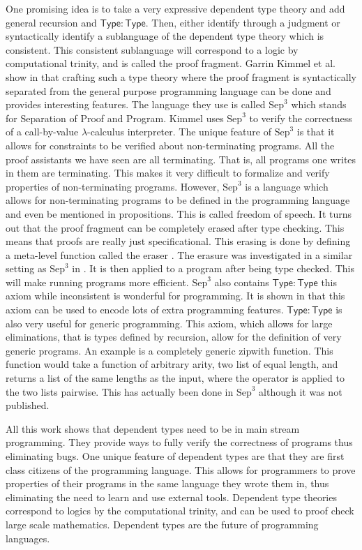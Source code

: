 One promising idea is to take a very expressive dependent type theory
and add general recursion and $\mathsf{Type:Type}$.  Then, either
identify through a judgment or syntactically identify a sublanguage of
the dependent type theory which is consistent.  This consistent
sublanguage will correspond to a logic by computational trinity, and
is called the proof fragment.  Garrin Kimmel et al. show in
\cite{Kimmel:2012} that crafting such a type theory where the proof
fragment is syntactically separated from the general purpose
programming language can be done and provides interesting features.
The language they use is called $\text{Sep}^3$ which stands for
Separation of Proof and Program. Kimmel uses $\text{Sep}^3$ to verify
the correctness of a call-by-value $\lambda$-calculus interpreter.
The unique feature of $\text{Sep}^3$ is that it allows for constraints
to be verified about non-terminating programs.  All the proof
assistants we have seen are all terminating.  That is, all programs
one writes in them are terminating.  This makes it very difficult to
formalize and verify properties of non-terminating programs.  However,
$\text{Sep}^3$ is a language which allows for non-terminating programs
to be defined in the programming language and even be mentioned in
propositions.  This is called freedom of speech.  It turns out that
the proof fragment can be completely erased after type checking.  This
means that proofs are really just specificational.  This erasing is
done by defining a meta-level function called the eraser
\cite{Mishra-Linger:2008}.  The erasure was investigated in a similar
setting as $\text{Sep}^3$ in \cite{Sjoberg:2012}.  It is then applied
to a program after being type checked.  This will make running
programs more efficient.  $\text{Sep}^3$ also contains
$\mathsf{Type:Type}$ this axiom while inconsistent is wonderful for
programming.  It is shown in \cite{Cardelli-1986} that this axiom can
be used to encode lots of extra programming features.
$\mathsf{Type:Type}$ is also very useful for generic programming.
This axiom, which allows for large eliminations, that is types defined
by recursion, allow for the definition of very generic programs.  An
example is a completely generic zipwith function.  This function would
take a function of arbitrary arity, two list of equal length, and
returns a list of the same lengths as the input, where the operator is
applied to the two lists pairwise.  This has actually been done in
$\text{Sep}^3$ although it was not published.

All this work shows that dependent types need to be in main stream
programming.  They provide ways to fully verify the correctness of
programs thus eliminating bugs.  One unique feature of dependent types
are that they are first class citizens of the programming language.
This allows for programmers to prove properties of their programs in
the same language they wrote them in,  thus eliminating the need to
learn and use external tools.  Dependent type theories correspond to
logics by the computational trinity, and can be used to
proof check large scale mathematics.  Dependent types are the future
of programming languages.


